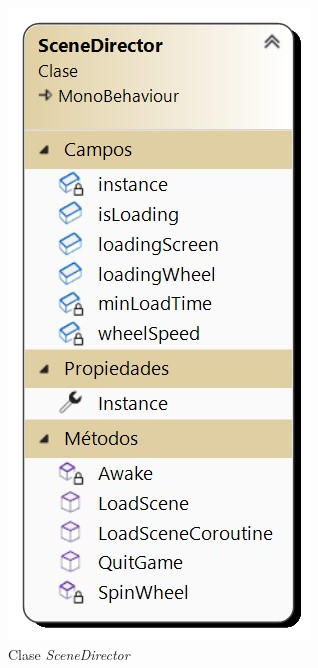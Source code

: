 \begin{figure}[h]
	\centering
	\includegraphics[scale=0.45]{img/SceneDirector.jpg}
	\caption{Clase \textit{SceneDirector}}
	\label{fig:SceneDirector}
    \end{figure}

